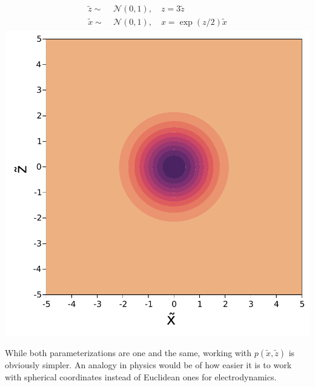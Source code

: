 \begin{minipage}{0.5\textwidth}
    \centering
    \begin{align}
        \begin{aligned}
            \tilde{z} \sim&\; \mathcal{N}(0, 1),\quad z = 3\tilde{z}\\
            \tilde{x} \sim&\; \mathcal{N}(0, 1),\quad x = \exp(z/2)\tilde{x}
        \end{aligned}
    \end{align}
    \includegraphics[width=\textwidth]{./chapters/1_introduction/figures/neals_funnel_non_centered.pdf}
    \label{fig:neals_noncentered}
\end{minipage}
\vspace{0.5cm}

While both parameterizations are one and the same, working with $p(\tilde{x},\tilde{z})$ is obviously simpler.
An analogy in physics would be of how easier it is to work with spherical coordinates instead of Euclidean ones for electrodynamics. 

